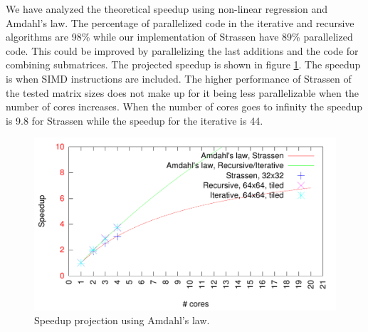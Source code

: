We have analyzed the theoretical speedup using non-linear regression and Amdahl's law. The percentage of parallelized code in the iterative and recursive algorithms are 98\% while our implementation of Strassen have 89\% parallelized code. This could be improved by parallelizing the last additions and the code for combining submatrices. The projected speedup is shown in figure \ref{fig:amdahl}. The speedup is when SIMD instructions are included. The higher performance of Strassen of the tested matrix sizes does not make up for it being less parallelizable when the number of cores increases. When the number of cores goes to infinity the speedup is 9.8 for Strassen while the speedup for the iterative is 44.


\begin{figure}[h!]
  \centering
  \includegraphics[width=\textwidth]{"../project2/gnuplots/amdahl"}
  \caption{Speedup projection using Amdahl's law.}
  \label{fig:amdahl}
\end{figure}
